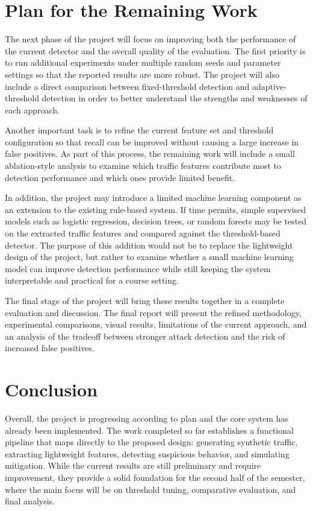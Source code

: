 \documentclass[11pt]{article}
\begin{document}
\section*{Plan for the Remaining Work}
The next phase of the project will focus on improving both the performance of the current detector and the overall quality of the evaluation. The first priority is to run additional experiments under multiple random seeds and parameter settings so that the reported results are more robust. The project will also include a direct comparison between fixed-threshold detection and adaptive-threshold detection in order to better understand the strengths and weaknesses of each approach.

Another important task is to refine the current feature set and threshold configuration so that recall can be improved without causing a large increase in false positives. As part of this process, the remaining work will include a small ablation-style analysis to examine which traffic features contribute most to detection performance and which ones provide limited benefit.

In addition, the project may introduce a limited machine learning component as an extension to the existing rule-based system. If time permits, simple supervised models such as logistic regression, decision trees, or random forests may be tested on the extracted traffic features and compared against the threshold-based detector. The purpose of this addition would not be to replace the lightweight design of the project, but rather to examine whether a small machine learning model can improve detection performance while still keeping the system interpretable and practical for a course setting.

The final stage of the project will bring these results together in a complete evaluation and discussion. The final report will present the refined methodology, experimental comparisons, visual results, limitations of the current approach, and an analysis of the tradeoff between stronger attack detection and the risk of increased false positives.

\section*{Conclusion}
Overall, the project is progressing according to plan and the core system has already been implemented. The work completed so far establishes a functional pipeline that maps directly to the proposed design: generating synthetic traffic, extracting lightweight features, detecting suspicious behavior, and simulating mitigation. While the current results are still preliminary and require improvement, they provide a solid foundation for the second half of the semester, where the main focus will be on threshold tuning, comparative evaluation, and final analysis.
\end{document}
